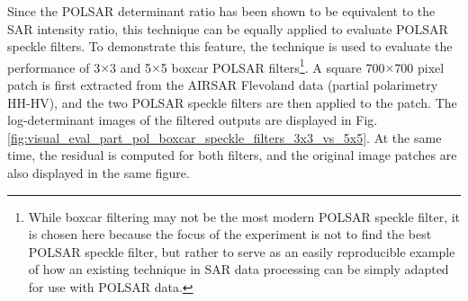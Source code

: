 \documentclass[journal]{IEEEtran}
\begin{document}

Since the POLSAR determinant ratio has been shown to be equivalent to the SAR intensity ratio,
  this technique can be equally applied to evaluate POLSAR speckle filters.
To demonstrate this feature, the technique is used to evaluate the performance of 3$\times$3 and 5$\times$5 boxcar POLSAR filters\footnote{While boxcar filtering may not be the most modern POLSAR speckle filter,
  it is chosen here because the focus of the experiment is not to find the best POLSAR speckle filter, but rather to serve as an easily reproducible example of how an existing technique in SAR data processing can be simply adapted for use with POLSAR data.}.
  A square 700$\times$700 pixel patch is first extracted from the AIRSAR Flevoland data (partial polarimetry HH-HV),
  and the two POLSAR speckle filters are then applied to the patch.
The log-determinant images of the filtered outputs are displayed in Fig. \ref{fig:visual_eval_part_pol_boxcar_speckle_filters_3x3_vs_5x5}.
At the same time, the residual is computed for both filters, and the original image patches are also displayed in the same figure.
\end{document}
